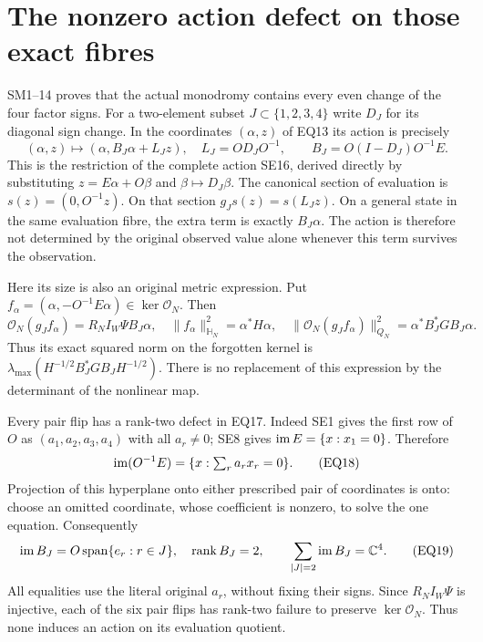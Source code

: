 \section{The nonzero action defect on those exact fibres}
SM1--14 \cite{eightmin:FC} proves that the actual monodromy contains every
even change of the four factor signs. For a two-element subset
$J\subset\{1,2,3,4\}$ write $D_J$ for its diagonal sign change.
In the coordinates $(\alpha,z)$ of EQ13 its action is precisely
\[
 (\alpha,z)\longmapsto(\alpha,B_J\alpha+L_Jz),\quad
 L_J=OD_JO^{-1},\qquad B_J=O(I-D_J)O^{-1}E.                           \tag{EQ16}
\]
This is the restriction of the complete action SE16, derived directly
by substituting $z=E\alpha+O\beta$ and $\beta\mapsto D_J\beta$.
The canonical section of evaluation is $s(z)=(0,O^{-1}z)$.
On that section $g_Js(z)=s(L_Jz)$. On a general state in the
same evaluation fibre, the extra term is exactly $B_J\alpha$.
The action is therefore not determined by the original observed
value alone whenever this term survives the observation.

Here its size is also an original metric expression. Put
$f_\alpha=(\alpha,-O^{-1}E\alpha)\in\ker\mathcal O_N$. Then
\[
 \mathcal O_N(g_J f_\alpha)=R_NI_W\Psi B_J\alpha,\quad
 \|f_\alpha\|_{\mathbb H_N}^2=\alpha^*H\alpha,\quad
 \|\mathcal O_N(g_J f_\alpha)\|_{Q_N}^2
       =\alpha^*B_J^*GB_J\alpha.                                   \tag{EQ17}
\]
Thus its exact squared norm on the forgotten kernel is
$\lambda_{\max}(H^{-1/2}B_J^*GB_JH^{-1/2})$. There is no replacement
of this expression by the determinant of the nonlinear map.

Every pair flip has a rank-two defect in EQ17. Indeed SE1 gives
the first row of $O$ as $(a_1,a_2,a_3,a_4)$ with all $a_r\ne0$;
SE8 gives $\operatorname{im} E=\{x:x_1=0\}$. Therefore
\[
 \operatorname{im}(O^{-1}E)=\{x:\textstyle\sum_r a_rx_r=0\}.                     \tag{EQ18}
\]
Projection of this hyperplane onto either prescribed pair of
coordinates is onto: choose an omitted coordinate, whose coefficient
is nonzero, to solve the one equation. Consequently
\[
 \operatorname{im} B_J=O\operatorname{span}\{e_r:r\in J\},\quad\operatorname{rank} B_J=2,
 \qquad\sum_{|J|=2}\operatorname{im} B_J=\mathbb C^4.                                  \tag{EQ19}
\]
All equalities use the literal original $a_r$, without fixing their
signs. Since $R_NI_W\Psi$ is injective, each of the six pair flips
has rank-two failure to preserve $\ker\mathcal O_N$.
Thus none induces an action on its evaluation quotient.

